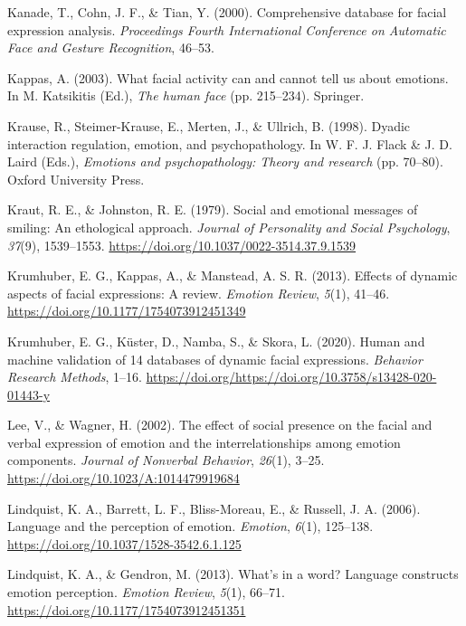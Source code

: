 \documentclass[
  english,
  doc]{apa7}
\newlength{\cslhangindent}
\newenvironment{cslreferences}%
  {\setlength{\parindent}{0pt}%
  \everypar{\setlength{\hangindent}{\cslhangindent}}\ignorespaces}%
  {\par}
\begin{document}
\begin{cslreferences}
\leavevmode\hypertarget{ref-kanade2000comprehensive}{}%
Kanade, T., Cohn, J. F., \& Tian, Y. (2000). Comprehensive database for facial expression analysis. \emph{Proceedings Fourth International Conference on Automatic Face and Gesture Recognition}, 46--53.

\leavevmode\hypertarget{ref-kappas2003facial}{}%
Kappas, A. (2003). What facial activity can and cannot tell us about emotions. In M. Katsikitis (Ed.), \emph{The human face} (pp. 215--234). Springer.

\leavevmode\hypertarget{ref-krause1998dyadic}{}%
Krause, R., Steimer-Krause, E., Merten, J., \& Ullrich, B. (1998). Dyadic interaction regulation, emotion, and psychopathology. In W. F. J. Flack \& J. D. Laird (Eds.), \emph{Emotions and psychopathology: Theory and research} (pp. 70--80). Oxford University Press.

\leavevmode\hypertarget{ref-kraut1979social}{}%
Kraut, R. E., \& Johnston, R. E. (1979). Social and emotional messages of smiling: An ethological approach. \emph{Journal of Personality and Social Psychology}, \emph{37}(9), 1539--1553. \url{https://doi.org/10.1037/0022-3514.37.9.1539}

\leavevmode\hypertarget{ref-krumhuber2013effects}{}%
Krumhuber, E. G., Kappas, A., \& Manstead, A. S. R. (2013). Effects of dynamic aspects of facial expressions: A review. \emph{Emotion Review}, \emph{5}(1), 41--46. \url{https://doi.org/10.1177/1754073912451349}

\leavevmode\hypertarget{ref-krumhuber2020human}{}%
Krumhuber, E. G., Küster, D., Namba, S., \& Skora, L. (2020). Human and machine validation of 14 databases of dynamic facial expressions. \emph{Behavior Research Methods}, 1--16. \url{https://doi.org/https://doi.org/10.3758/s13428-020-01443-y}

\leavevmode\hypertarget{ref-lee2002effect}{}%
Lee, V., \& Wagner, H. (2002). The effect of social presence on the facial and verbal expression of emotion and the interrelationships among emotion components. \emph{Journal of Nonverbal Behavior}, \emph{26}(1), 3--25. \url{https://doi.org/10.1023/A:1014479919684}

\leavevmode\hypertarget{ref-lindquist2006language}{}%
Lindquist, K. A., Barrett, L. F., Bliss-Moreau, E., \& Russell, J. A. (2006). Language and the perception of emotion. \emph{Emotion}, \emph{6}(1), 125--138. \url{https://doi.org/10.1037/1528-3542.6.1.125}

\leavevmode\hypertarget{ref-lindquist2013s}{}%
Lindquist, K. A., \& Gendron, M. (2013). What's in a word? Language constructs emotion perception. \emph{Emotion Review}, \emph{5}(1), 66--71. \url{https://doi.org/10.1177/1754073912451351}


\end{cslreferences}
\end{document}
